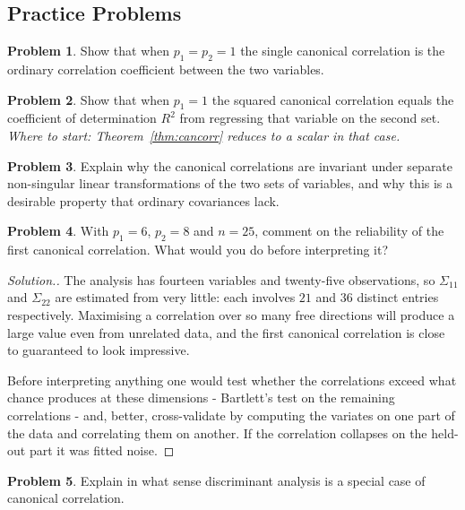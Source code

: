 \documentclass[11pt,a4paper]{article}
\theoremstyle{definition}
\newtheorem{problemx}{Problem}[section]
\newenvironment{problem}{\begin{problemx}}{\end{problemx}}
\newenvironment{solution}
  {\renewcommand{\qedsymbol}{}\begin{proof}[\textit{Solution}.]}
  {\end{proof}}
\begin{document}
\newpage

\subsection{Practice Problems}

\begin{problem}
Show that when $p_1=p_2=1$ the single canonical correlation is the ordinary
correlation coefficient between the two variables.
\end{problem}

\begin{problem}
Show that when $p_1=1$ the squared canonical correlation equals the coefficient
of determination $R^{2}$ from regressing that variable on the second set.
\emph{Where to start: Theorem~\ref{thm:cancorr} reduces to a scalar in that
case.}
\end{problem}

\begin{problem}
Explain why the canonical correlations are invariant under separate non-singular
linear transformations of the two sets of variables, and why this is a desirable
property that ordinary covariances lack.
\end{problem}

\begin{problem}
With $p_1=6$, $p_2=8$ and $n=25$, comment on the reliability of the first
canonical correlation. What would you do before interpreting it?
\end{problem}

\begin{solution}
The analysis has fourteen variables and twenty-five observations, so
$\Sigma_{11}$ and $\Sigma_{22}$ are estimated from very little: each involves
$21$ and $36$ distinct entries respectively. Maximising a correlation over so
many free directions will produce a large value even from unrelated data, and
the first canonical correlation is close to guaranteed to look impressive.

Before interpreting anything one would test whether the correlations exceed what
chance produces at these dimensions - Bartlett's test on the remaining
correlations - and, better, cross-validate by computing the variates on one part
of the data and correlating them on another. If the correlation collapses on the
held-out part it was fitted noise.
\end{solution}

\begin{problem}
Explain in what sense discriminant analysis is a special case of canonical
correlation.
\end{problem}
\end{document}
